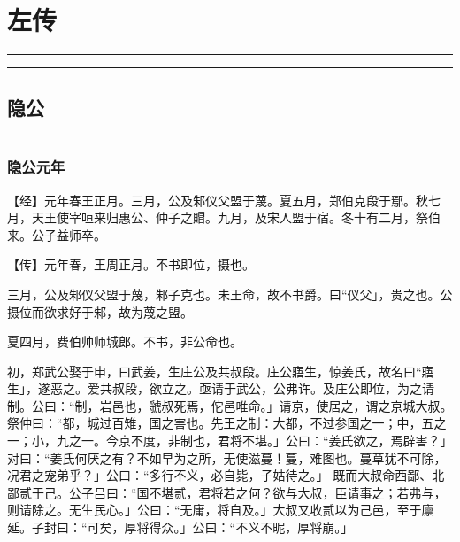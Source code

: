 \documentclass[]{article}
\date{}
\begin{document}
\hypertarget{header-n0}{%
\section{左传}\label{header-n0}}

\begin{center}\rule{0.5\linewidth}{\linethickness}\end{center}

\tableofcontents

\begin{center}\rule{0.5\linewidth}{\linethickness}\end{center}

\hypertarget{header-n7}{%
\subsection{隐公}\label{header-n7}}

\begin{center}\rule{0.5\linewidth}{\linethickness}\end{center}

\hypertarget{header-n9}{%
\subsubsection{隐公元年}\label{header-n9}}

【经】元年春王正月。三月，公及邾仪父盟于蔑。夏五月，郑伯克段于鄢。秋七月，天王使宰咺来归惠公、仲子之賵。九月，及宋人盟于宿。冬十有二月，祭伯来。公子益师卒。

【传】元年春，王周正月。不书即位，摄也。

三月，公及邾仪父盟于蔑，邾子克也。未王命，故不书爵。曰``仪父」，贵之也。公摄位而欲求好于邾，故为蔑之盟。

夏四月，费伯帅师城郎。不书，非公命也。

初，郑武公娶于申，曰武姜，生庄公及共叔段。庄公寤生，惊姜氏，故名曰``寤生」，遂恶之。爱共叔段，欲立之。亟请于武公，公弗许。及庄公即位，为之请制。公曰：``制，岩邑也，虢叔死焉，佗邑唯命。」请京，使居之，谓之京城大叔。祭仲曰：``都，城过百雉，国之害也。先王之制：大都，不过参国之一；中，五之一；小，九之一。今京不度，非制也，君将不堪。」公曰：``姜氏欲之，焉辟害？」对曰：``姜氏何厌之有？不如早为之所，无使滋蔓！蔓，难图也。蔓草犹不可除，况君之宠弟乎？」公曰：``多行不义，必自毙，子姑待之。」
既而大叔命西鄙、北鄙贰于己。公子吕曰：``国不堪贰，君将若之何？欲与大叔，臣请事之；若弗与，则请除之。无生民心。」公曰：``无庸，将自及。」大叔又收贰以为己邑，至于廪延。子封曰：``可矣，厚将得众。」公曰：``不义不昵，厚将崩。」
\end{document}
